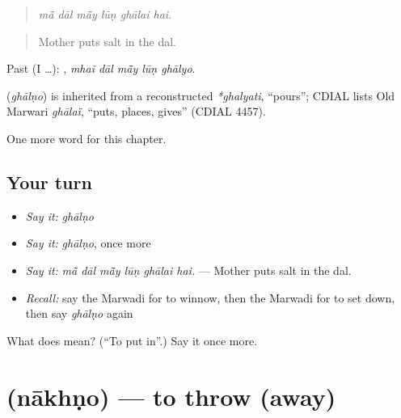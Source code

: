 \begin{quote}
     
\end{quote}

\begin{quote}
\emph{mā̃ dāl mā̃y lūṇ ghālai hai.}
\end{quote}

\begin{quote}
Mother puts salt in the dal.
\end{quote}

Past (I …):     , \emph{mhaĩ dāl mā̃y lūṇ ghālyo}.

\begin{cousinweb}
\textbf{} (\emph{ghālṇo}) is inherited from a reconstructed \emph{*ghalyati}, \textquotedblleft{}pours\textquotedblright{}; CDIAL lists Old Marwari \emph{ghālaï}, \textquotedblleft{}puts, places, gives\textquotedblright{} (CDIAL 4457).
\end{cousinweb}

\begin{grammarlens}[title={What you've built}]
One more word for this chapter.
\end{grammarlens}

\subsection*{Your turn}
\begin{itemize}
\raggedright
  \item \emph{Say it:} \emph{ghālṇo}
  \item \emph{Say it:} \emph{ghālṇo}, once more
  \item \emph{Say it:} \emph{mā̃ dāl mā̃y lūṇ ghālai hai.} — Mother puts salt in the dal.
  \item \emph{Recall:} say the Marwadi for to winnow, then the Marwadi for to set down, then say \emph{ghālṇo} again
\end{itemize}

\begin{tcolorbox}[breakable,colback=teal!4,colframe=teal!35!black,title={Before you move on}]
What does  mean? (\textquotedblleft{}To put in\textquotedblright{}.) Say it once more.
\end{tcolorbox}
\section[\texorpdfstring{\mw{नाखणो} (nākhṇo)}{नाखणो (nākhṇo)}]{ (nākhṇo) — to throw (away)}

